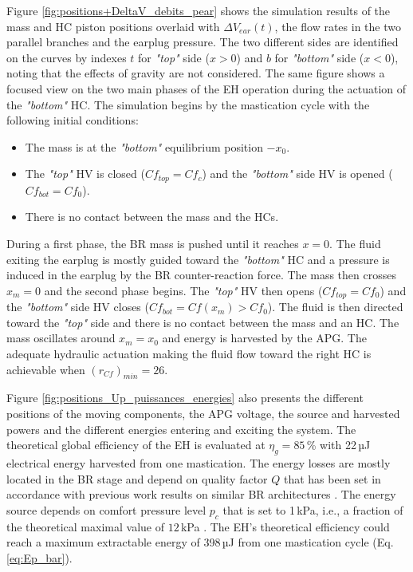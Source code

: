 \documentclass[3p,twocolumn,preprint]{elsarticle}
\begin{document}
Figure \ref{fig:positions+DeltaV_debits_pear} shows the simulation results of the mass and HC piston positions overlaid with $\Delta V_{ear}(t)$, the flow rates in the two parallel branches and the earplug pressure. The two different sides are identified on the curves by indexes $t$ for \emph{"top"} side ($x>0$) and $b$ for \emph{"bottom"} side ($x<0$), noting that the effects of gravity are not considered. The same figure shows a focused view on the two main phases of the EH operation during the actuation of the \emph{"bottom"} HC. The simulation begins by the mastication cycle with the following initial conditions:
\begin{itemize}
	\item The mass is at the \emph{"bottom"} equilibrium position $-x_0$.
	\item The \emph{"top"} HV is closed ($Cf_{top} = Cf_c$) and the \emph{"bottom"} side HV is opened ($Cf_{bot} = Cf_0$).
	\item There is no contact between the mass and the HCs.
\end{itemize}

During a first phase, the BR mass is pushed until it reaches $x=0$. The fluid exiting the earplug is mostly guided toward the \emph{"bottom"} HC and a pressure is induced in the earplug by the BR counter-reaction force. The mass then crosses $x_m=0$ and the second phase begins. The \emph{"top"} HV then opens ($Cf_{top} = Cf_0$) and the \emph{"bottom"} side HV closes ($Cf_{bot} = Cf(x_m)>Cf_0$). The fluid is then directed toward the \emph{"top"} side and there is no contact between the mass and an HC. The mass oscillates around $x_m=x_0$ and energy is harvested by the APG. The adequate hydraulic actuation making the fluid flow toward the right HC is achievable when \mbox{$(r_{Cf})_{min}=26$}.  

Figure \ref{fig:positions_Up_puissances_energies} also presents the different positions of the moving components, the APG voltage, the source and harvested powers and the different energies entering and exciting the system. The theoretical global efficiency of the EH is evaluated at \mbox{$\eta_g=85$\,\%} with 22\,µJ electrical energy harvested from one mastication. The energy losses are mostly located in the BR stage and depend on quality factor $Q$ that has been set in accordance with previous work results on similar BR architectures \cite{Liu2013}. The energy source depends on comfort pressure level $p_c$ that is set to 1\,kPa, i.e., a fraction of the theoretical maximal value of $12$\,kPa \cite{Bouchard-Roy2020}. The EH's theoretical efficiency could reach a maximum extractable energy of 398\,µJ from one mastication cycle (Eq. \ref{eq:Ep_bar}).
\end{document}
